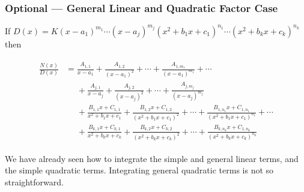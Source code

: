 \subsubsection*{Optional --- General Linear and Quadratic Factor Case}
If
$
D(x)=K(x-a_1)^{m_1}\cdots(x-a_j)^{m_j}
(x^2+b_1x+c_1)^{n_1}\cdots(x^2+b_kx+c_k)^{n_k}
$
then
\begin{impeqn}\label{eq:PFdecompd}
\begin{align*}
\begin{split}
\frac{N(x)}{D(x)}
&=\frac{A_{1,1}}{x-a_1}+\frac{A_{1,2}}{(x-a_1)^2}+\cdots
          +\frac{A_{1,m_1}}{(x-a_1)^{m_1}}+\cdots\\
&\phantom{=}\!+\frac{A_{j,1}}{x-a_j}+\frac{A_{j,2}}{(x-a_j)^2}+\cdots
          +\frac{A_{j,m_j}}{(x-a_j)^{m_j}}\\
&\phantom{=}\!+\frac{B_{1,1}x+C_{1,1}}{x^2+b_1x+c_1}
          +\frac{B_{1,2}x+C_{1,2}}{(x^2+b_1x+c_1)^2}+\!\cdots\!
          +\frac{B_{1,n_1}x+C_{1,n_1}}{(x^2+b_1x+c_1)^{n_1}}\!+\!\cdots\\
&\phantom{=}\!+\frac{B_{k,1}x+C_{k,1}}{x^2+b_kx+c_k}
          +\frac{B_{k,2}x+C_{k,2}}{(x^2+b_kx+c_k)^2}+\!\cdots\!
          +\frac{B_{k,n_k}x+C_{1,n_k}}{(x^2+b_kx+c_k)^{n_k}}
\end{split}
\end{align*}
\end{impeqn}
We have already seen how to integrate the simple and general linear terms, and the simple
quadratic terms. Integrating general quadratic terms is not so straightforward.
